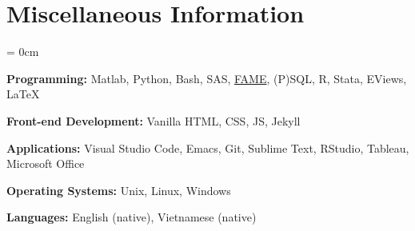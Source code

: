 \documentclass[a4paper, 10pt]{article}
\begin{document}
  \section{Miscellaneous Information}
  \begin{compactitem}\parskip = 0cm
    \item \textbf{Programming:} Matlab, Python, Bash, SAS, \href{https://en.wikipedia.org/wiki/FAME_(database)}{FAME}, (P)SQL, R, Stata, EViews, \LaTeX
    \item \textbf{Front-end Development:} Vanilla HTML, CSS, JS, Jekyll
    \item \textbf{Applications:} Visual Studio Code, Emacs, Git, Sublime Text, RStudio, Tableau, Microsoft Office
    \item \textbf{Operating Systems:} Unix, Linux, Windows
    \item \textbf{Languages:} English (native), Vietnamese (native)
  \end{compactitem}
\end{document}
